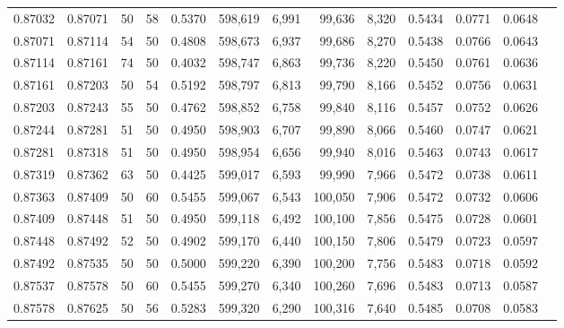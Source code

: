 \begin{tabular}{rrrrrrrrrrrrr}
0.87032 & 0.87071 &    50 &  58 &                                     0.5370 & 598,619 &   6,991 &  99,636 &   8,320 & 0.5434 & 0.0771 & 0.0648 \\
0.87071 & 0.87114 &    54 &  50 &                                     0.4808 & 598,673 &   6,937 &  99,686 &   8,270 & 0.5438 & 0.0766 & 0.0643 \\
0.87114 & 0.87161 &    74 &  50 &                                     0.4032 & 598,747 &   6,863 &  99,736 &   8,220 & 0.5450 & 0.0761 & 0.0636 \\
0.87161 & 0.87203 &    50 &  54 &                                     0.5192 & 598,797 &   6,813 &  99,790 &   8,166 & 0.5452 & 0.0756 & 0.0631 \\
0.87203 & 0.87243 &    55 &  50 &                                     0.4762 & 598,852 &   6,758 &  99,840 &   8,116 & 0.5457 & 0.0752 & 0.0626 \\
0.87244 & 0.87281 &    51 &  50 &                                     0.4950 & 598,903 &   6,707 &  99,890 &   8,066 & 0.5460 & 0.0747 & 0.0621 \\
0.87281 & 0.87318 &    51 &  50 &                                     0.4950 & 598,954 &   6,656 &  99,940 &   8,016 & 0.5463 & 0.0743 & 0.0617 \\
0.87319 & 0.87362 &    63 &  50 &                                     0.4425 & 599,017 &   6,593 &  99,990 &   7,966 & 0.5472 & 0.0738 & 0.0611 \\
0.87363 & 0.87409 &    50 &  60 &                                     0.5455 & 599,067 &   6,543 & 100,050 &   7,906 & 0.5472 & 0.0732 & 0.0606 \\
0.87409 & 0.87448 &    51 &  50 &                                     0.4950 & 599,118 &   6,492 & 100,100 &   7,856 & 0.5475 & 0.0728 & 0.0601 \\
0.87448 & 0.87492 &    52 &  50 &                                     0.4902 & 599,170 &   6,440 & 100,150 &   7,806 & 0.5479 & 0.0723 & 0.0597 \\
0.87492 & 0.87535 &    50 &  50 &                                     0.5000 & 599,220 &   6,390 & 100,200 &   7,756 & 0.5483 & 0.0718 & 0.0592 \\
0.87537 & 0.87578 &    50 &  60 &                                     0.5455 & 599,270 &   6,340 & 100,260 &   7,696 & 0.5483 & 0.0713 & 0.0587 \\
0.87578 & 0.87625 &    50 &  56 &                                     0.5283 & 599,320 &   6,290 & 100,316 &   7,640 & 0.5485 & 0.0708 & 0.0583 \\

\end{tabular}
